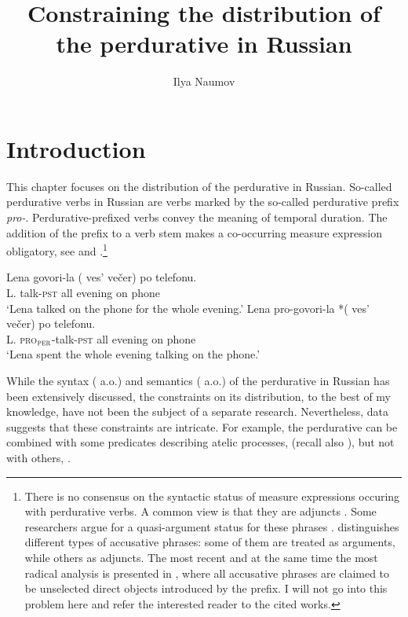\documentclass[output=paper,
]{langscibook}
\author{Ilya Naumov\affiliation{National Research University Higher School of Economics}}
\title{Constraining the distribution of the perdurative in Russian}
\begin{document}
%
\maketitle

\section{Introduction} \label{sec:naumov:1}
This chapter focuses on the distribution of the perdurative in Russian. So-called perdurative verbs in Russian are verbs marked by the so-called perdurative prefix \textit{pro-}. Perdurative-prefixed verbs convey the meaning of temporal duration. The addition of the prefix to a verb stem makes a co-occurring measure expression obligatory, see  and .\footnote{There is no consensus on the syntactic status of measure expressions occuring with perdurative verbs. A common view is that they are adjuncts \citep[a.o.]{borik2006aspect,ramchand2008verb,gehrke2008ps}. Some researchers argue for a quasi-argument status for these phrases \citep{fowler1993argument}. \citet{schoorlemmer1995participial} distinguishes different types of accusative phrases: some of them are treated as arguments, while others as adjuncts. The most recent and at the same time the most radical analysis is presented in \citet{Žaucer2009vp,Žaucer2012syntax}, where all accusative phrases are claimed to be unselected direct objects introduced by the prefix. I will not go into this problem here and refer the interested reader to the cited works.}

\ea \ea \label{ex:naumov:1}
\gll Lena	govori-la	(\hspace{-2pt} ves’	večer)		po	telefonu.\\  
     L.	talk-\textsc{pst} {} all	evening	on	phone\\ 
\glt `Lena talked on the phone for the whole evening.'
\ex\gll Lena pro-govori-la *(\hspace{-2pt} ves' večer)		po telefonu.\\  
     L. \textsc{pro}$_{\textsc{per}}$-talk-\textsc{pst} {} all	evening	on	phone\\ 
\glt `Lena spent the whole evening talking on the phone.'\label{ex:naumov:1b}
\z \z

\noindent While the syntax (\citealt{babko1999zero,ramchand2005time,svenonius2004slavic,romanova2007constructing,gehrke2008ps,Žaucer2009vp,tolskaya2015verbal} a.o.) and semantics (\citealt{isacenko1960grammaticeskij,bondarko1967,forsyth1970grammar,flier1985scope,zalizniak2000,gehrke2003aspectual,filip2005measures} a.o.) of the perdurative in Russian has been extensively discussed, the constraints on its distribution, to the best of my knowledge, have not been the subject of a separate research. Nevertheless, data suggests that these constraints are intricate. For example, the perdurative can be combined with some predicates describing atelic processes,  (recall also ), but not with others, .
\end{document}

